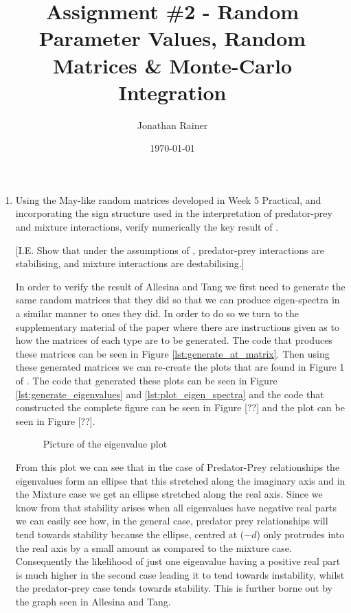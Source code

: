 \documentclass[11pt]{scrreprt}
\title{Assignment \#2 - Random Parameter Values, Random Matrices \& Monte-Carlo Integration}
\date{\today}
\author{Jonathan Rainer}
\begin{document}
	\fancyhf{}
	\chead{\thepage}
	\rhead{\today}
	\renewcommand{\headrulewidth}{0.3pt}
	\renewcommand{\footrulewidth}{0.3pt}
	\renewcommand{\footrulewidth}{0pt}
	\maketitle
	
	\setcounter{chapter}{1}
	\begin{enumerate}
	
		\item Using the May-like random matrices developed in Week 5 Practical, and incorporating the sign structure used in the \citet{Allesina2012} interpretation of predator-prey and mixture interactions, verify numerically the key result of \cite{Allesina2012}.
		
		[I.E. Show that under the assumptions of \cite{Allesina2012}, predator-prey interactions are stabilising, and mixture interactions are destabilising.]
		
		In order to verify the result of Allesina and Tang we first need to generate the same random matrices that they did so that we can produce eigen-spectra in a similar manner to ones they did. In order to do so we turn to the supplementary material \cite{Allesina2012} of the paper where there are instructions given as to how the matrices of each type are to be generated. The code that produces these matrices can be seen in Figure \ref{lst:generate_at_matrix}. Then using these generated matrices we can re-create the plots that are found in Figure 1 of \cite{Allesina2012}. The code that generated these plots can be seen in Figure \ref{lst:generate_eigenvalues} and \ref{lst:plot_eigen_spectra} and the code that constructed the complete figure can be seen in Figure [??] and the plot can be seen in Figure [??].
		
		\begin{figure}
			\caption{Picture of the eigenvalue plot}
		\end{figure}
		
		From this plot we can see that in the case of Predator-Prey relationships the eigenvalues form an ellipse that this stretched along the imaginary axis and in the Mixture case we get an ellipse stretched along the real axis. Since we know from \citet{May1972} that stability arises when all eigenvalues have negative real parts we can easily see how, in the general case, predator prey relationships will tend towards stability because the ellipse, centred at ($-d$) only protrudes into the real axis by a small amount as compared to the mixture case. Consequently the likelihood of just one eigenvalue having a positive real part is much higher in the second case leading it to tend towards instability, whilst the predator-prey case tends towards stability. This is further borne out by the graph seen in Allesina and Tang.
		

\end{enumerate}
\end{document}
